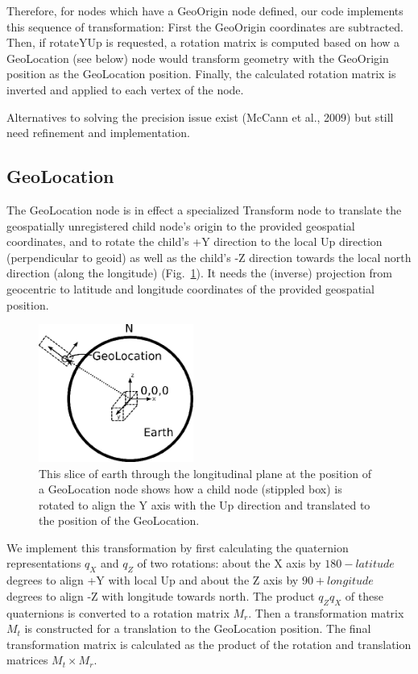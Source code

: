 \documentclass{acmsiggraph}                     %
\begin{document}
Therefore, for nodes which have a GeoOrigin node defined, our code implements this sequence of
transformation: First the GeoOrigin coordinates are subtracted. Then, if rotateYUp is requested, a
rotation matrix is computed based on how a GeoLocation (see below) node would transform geometry
with the GeoOrigin position as the GeoLocation position. Finally, the calculated rotation matrix is
inverted and applied to each vertex of the node.

Alternatives to solving the precision issue exist \cite{mccann09} (McCann et al., 2009) but still
need refinement and implementation.


\subsection{GeoLocation}

The GeoLocation node is in effect a specialized Transform node to translate the geospatially
unregistered child node's origin to the provided geospatial coordinates, and to rotate the child's
+Y direction to the local Up direction (perpendicular to geoid) as well as the child's -Z direction
towards the local north direction (along the longitude) (Fig.~\ref{fig:GeoLocationDiagram}). It
needs the (inverse) projection from geocentric to latitude and longitude coordinates of the provided
geospatial position.

\begin{figure}[htbp] \centering \includegraphics[width=2.0in]{GeoLocationDiagram.png} \caption{This
  slice of earth through the longitudinal plane at the position of a GeoLocation node shows how a
child node (stippled box) is rotated to align the Y axis with the Up direction and translated to the
position of the GeoLocation.} \label{fig:GeoLocationDiagram} \end{figure}

We implement this transformation by first calculating the quaternion representations $q_X$ and $q_Z$
of two rotations: about the X axis by $180 - latitude$ degrees to align +Y with local Up and about
the Z axis by $90 + longitude$ degrees to align -Z with longitude towards north. The product
$q_{Z}q_{X}$ of these quaternions is converted to a rotation matrix $M_r$. Then a transformation
matrix $M_t$ is constructed for a translation to the GeoLocation position. The final transformation
matrix is calculated as the product of the rotation and translation matrices $M_t \times M_r$.
\end{document}
